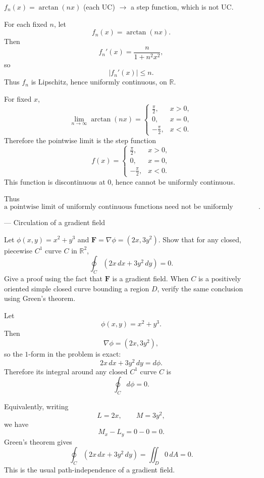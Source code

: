 \begin{problem}[CP-IV-0132]
\label{prob:cp-iv-0132}
$f_n(x)=\arctan(nx)$ (each UC) $\to$ a step function, which is not UC.
\end{problem}

\begin{solution}
For each fixed \(n\), let
\[
f_n(x)=\arctan(nx).
\]
Then
\[
f_n'(x)=\frac{n}{1+n^2x^2},
\]
so
\[
|f_n'(x)|\le n.
\]
Thus \(f_n\) is Lipschitz, hence uniformly continuous, on \(\mathbb R\).

For fixed \(x\),
\[
\lim_{n\to\infty}\arctan(nx)
=
\begin{cases}
\frac{\pi}{2},&x>0,\\[1mm]
0,&x=0,\\[1mm]
-\frac{\pi}{2},&x<0.
\end{cases}
\]
Therefore the pointwise limit is the step function
\[
f(x)=
\begin{cases}
\frac{\pi}{2},&x>0,\\
0,&x=0,\\
-\frac{\pi}{2},&x<0.
\end{cases}
\]
This function is discontinuous at \(0\), hence cannot be uniformly continuous.

Thus
\[
\boxed{
\text{a pointwise limit of uniformly continuous functions need not be uniformly continuous}.
}
\]
\end{solution}


\begin{problem}[CP-IV-0136]
\label{prob:cp-iv-0136}
— Circulation of a gradient field

Let $\phi(x,y)=x^2+y^3$ and $\mathbf F=\nabla\phi=(2x,3y^2)$.
Show that for any closed, piecewise $C^1$ curve $C$ in $\mathbb R^2$,
\[
\oint_C (2x\,dx+3y^2\,dy)=0.
\]
Give a proof using the fact that $\mathbf F$ is a gradient field.
When $C$ is a positively oriented simple closed curve bounding a region $D$,
verify the same conclusion using Green's theorem.
\end{problem}

\begin{solution}
Let
\[
\phi(x,y)=x^2+y^3.
\]
Then
\[
\nabla\phi=(2x,3y^2),
\]
so the \(1\)-form in the problem is exact:
\[
2x\,dx+3y^2\,dy=d\phi.
\]
Therefore its integral around any closed \(C^1\) curve \(C\) is
\[
\oint_C d\phi=0.
\]

Equivalently, writing
\[
L=2x,\qquad M=3y^2,
\]
we have
\[
M_x-L_y
=
0-0
=
0.
\]
Green's theorem gives
\[
\oint_C(2x\,dx+3y^2\,dy)
=
\iint_D0\,dA
=
\boxed{0}.
\]
This is the usual path-independence of a gradient field.
\end{solution}



